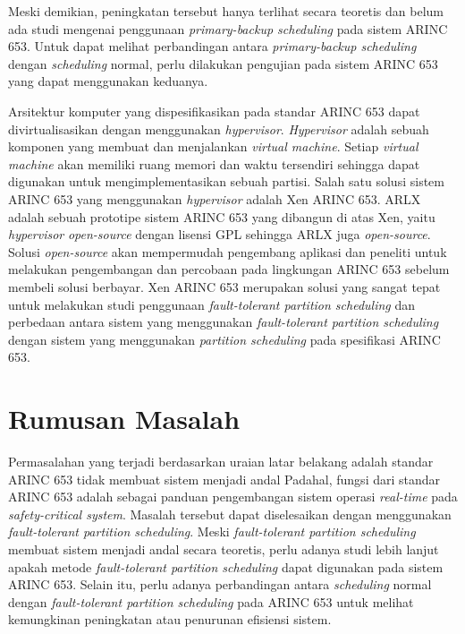 Meski demikian, peningkatan tersebut hanya terlihat secara teoretis dan belum ada studi mengenai
penggunaan \textit{primary-backup scheduling} pada sistem ARINC 653.  Untuk dapat melihat
perbandingan antara \textit{primary-backup scheduling} dengan \textit{scheduling} normal, perlu
dilakukan pengujian pada sistem ARINC 653 yang dapat menggunakan keduanya.

Arsitektur komputer yang dispesifikasikan pada standar ARINC 653 dapat divirtualisasikan dengan
menggunakan \textit{hypervisor}. \textit{Hypervisor} adalah sebuah komponen yang membuat dan
menjalankan \textit{virtual machine}.  Setiap \textit{virtual machine} akan memiliki ruang
memori dan waktu tersendiri sehingga dapat digunakan untuk mengimplementasikan sebuah partisi.
Salah satu solusi sistem ARINC 653 yang menggunakan \textit{hypervisor} adalah Xen ARINC 653.
ARLX adalah sebuah prototipe sistem ARINC 653 yang dibangun di atas Xen, yaitu
\textit{hypervisor} \textit{open-source} dengan lisensi GPL sehingga ARLX juga
\textit{open-source}.  Solusi \textit{open-source} akan mempermudah pengembang aplikasi dan
peneliti untuk melakukan pengembangan dan percobaan pada lingkungan ARINC 653 sebelum membeli
solusi berbayar. Xen ARINC 653 merupakan solusi yang sangat tepat untuk melakukan studi
penggunaan \textit{fault-tolerant partition scheduling} dan perbedaan antara sistem yang
menggunakan \textit{fault-tolerant partition scheduling} dengan sistem yang menggunakan
\textit{partition scheduling} pada spesifikasi ARINC 653.

\section{Rumusan Masalah}

Permasalahan yang terjadi berdasarkan uraian latar belakang adalah standar ARINC 653 tidak
membuat sistem menjadi andal  Padahal, fungsi dari standar ARINC 653 adalah sebagai panduan
pengembangan sistem operasi \textit{real-time} pada \textit{safety-critical system}.  Masalah
tersebut dapat diselesaikan dengan menggunakan \textit{fault-tolerant partition scheduling}.
Meski \textit{fault-tolerant partition scheduling} membuat sistem menjadi andal secara teoretis,
perlu adanya studi lebih lanjut apakah metode \textit{fault-tolerant partition scheduling} dapat
digunakan pada sistem ARINC 653.  Selain itu, perlu adanya perbandingan antara
\textit{scheduling} normal dengan \textit{fault-tolerant partition scheduling} pada ARINC 653
untuk melihat kemungkinan peningkatan atau penurunan efisiensi sistem.

